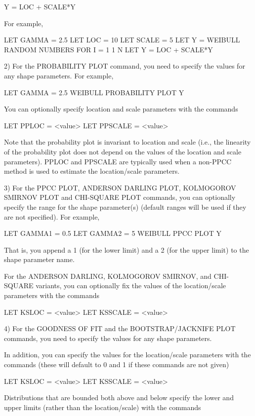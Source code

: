           Y = LOC + SCALE*Y

      For example,

          LET GAMMA = 2.5
          LET LOC = 10
          LET SCALE = 5
          LET Y = WEIBULL RANDOM NUMBERS FOR I = 1 1 N
          LET Y = LOC + SCALE*Y

   2) For the PROBABILITY PLOT command, you need to specify the
      values for any shape parameters.  For example,

          LET GAMMA = 2.5
          WEIBULL PROBABILITY PLOT Y

      You can optionally specify location and scale parameters with
      the commands

          LET PPLOC = <value>
          LET PPSCALE = <value>

      Note that the probability plot is invariant to location and
      scale (i.e., the linearity of the probability plot does not
      depend on the values of the location and scale parameters).
      PPLOC and PPSCALE are typically used when a non-PPCC method
      is used to estimate the location/scale parameters.
      
   3) For the PPCC PLOT, ANDERSON DARLING PLOT, KOLMOGOROV SMIRNOV PLOT
      and CHI-SQUARE PLOT commands, you can optionally specify the
      range for the shape parameter(s) (default ranges will be used if
      they are not specified).  For example,

          LET GAMMA1 = 0.5
          LET GAMMA2 = 5
          WEIBULL PPCC PLOT Y

      That is, you append a 1 (for the lower limit) and a 2 (for the
      upper limit) to the shape parameter name.

      For the ANDERSON DARLING, KOLMOGOROV SMIRNOV, and CHI-SQUARE
      variants, you can optionally fix the values of the location/scale
      parameters with the commands

          LET KSLOC = <value>
          LET KSSCALE = <value>

   4) For the GOODNESS OF FIT and the BOOTSTRAP/JACKNIFE PLOT commands,
      you need to specify the values for any shape parameters.

      In addition, you can specify the values for the location/scale
      parameters with the commands (these will default to 0 and 1
      if these commands are not given)

          LET KSLOC = <value>
          LET KSSCALE = <value>

      Distributions that are bounded both above and below specify
      the lower and upper limits (rather than the location/scale)
      with the commands

